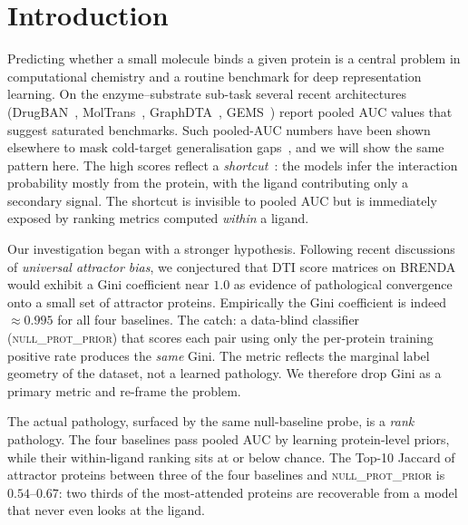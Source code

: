 \documentclass[11pt,a4paper]{article}
\newcommand{\nullprior}{\textsc{null\_prot\_prior}\xspace}
\begin{document}
\section{Introduction}
\label{sec:intro}

Predicting whether a small molecule binds a given protein is a central
problem in computational chemistry and a routine benchmark for deep
representation learning. On the enzyme--substrate sub-task several
recent architectures (DrugBAN~\citep{bai2023drugban},
MolTrans~\citep{huang2021moltrans}, GraphDTA~\citep{nguyen2021graphdta},
GEMS~\citep{wang2023gems}) report pooled AUC values that suggest
saturated benchmarks. Such pooled-AUC numbers have been shown elsewhere
to mask cold-target generalisation
gaps~\citep{pahikkala2015,jiang2020dtigeneralisation}, and we will show
the same pattern here. The high scores reflect a
\emph{shortcut}~\citep{geirhos2020shortcut,kapoor2023leakage}: the
models infer the interaction probability mostly from the protein, with
the ligand contributing only a secondary signal. The shortcut is
invisible to pooled AUC but is immediately exposed by ranking metrics
computed \emph{within} a ligand.

Our investigation began with a stronger hypothesis. Following recent
discussions of \emph{universal attractor bias}, we conjectured that DTI
score matrices on BRENDA would exhibit a Gini coefficient near $1.0$ as
evidence of pathological convergence onto a small set of attractor
proteins. Empirically the Gini coefficient is indeed $\approx 0.995$
for all four baselines. The catch: a data-blind classifier (\nullprior)
that scores each pair using only the per-protein training positive rate
produces the \emph{same} Gini. The metric reflects the marginal label
geometry of the dataset, not a learned pathology. We therefore drop
Gini as a primary metric and re-frame the problem.

The actual pathology, surfaced by the same null-baseline probe, is a
\emph{rank} pathology. The four baselines pass pooled AUC by learning
protein-level priors, while their within-ligand ranking sits at or
below chance. The Top-10 Jaccard of attractor proteins between three of
the four baselines and \nullprior is $0.54$--$0.67$: two thirds of the
most-attended proteins are recoverable from a model that never even
looks at the ligand.
\end{document}
